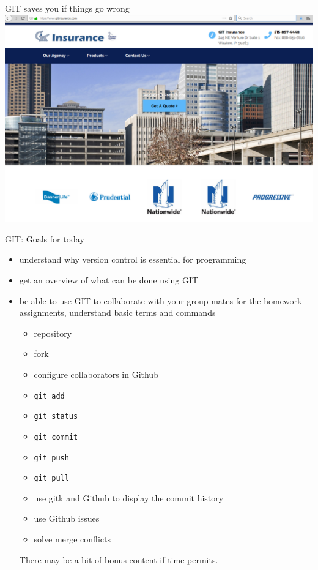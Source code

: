 \begin{frame}[fragile]{GIT saves you if things go wrong}
    \includegraphics[width=\textwidth]{images/git-insurance.png}
\end{frame}


\begin{frame}[fragile]{GIT: Goals for today}
    \begin{itemize}
        \item understand why version control is essential for programming\pause
        \item get an overview of what can be done using GIT\pause
        \item be able to use GIT to collaborate with your group mates for the homework
            assignments, understand basic terms and commands\pause
        \begin{itemize}
            \item repository
            \item fork
            \item configure collaborators in Github
            \item \verb|git add|
            \item \verb|git status|
            \item \verb|git commit|
            \item \verb|git push|
            \item \verb|git pull|
            \item use gitk and Github to display the commit history
            \item use Github issues
            \item solve merge conflicts
        \end{itemize}

        \pause
        \bigskip
        There may be a bit of bonus content if time permits.
    \end{itemize}
\end{frame}


